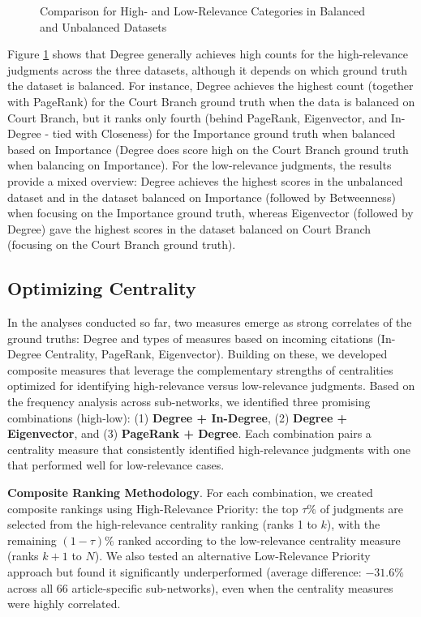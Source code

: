 \documentclass[sigconf,authordraft]{acmart}
\begin{document}
\begin{figure}[t!]
    \caption{Comparison for High- and Low-Relevance Categories in Balanced and Unbalanced Datasets}
    \label{fig:performers}
\end{figure}


Figure \ref{fig:performers} shows that Degree generally achieves high counts for the high-relevance judgments across the three datasets, although it depends on which ground truth the dataset is balanced. For instance, Degree achieves the highest count (together with PageRank) for the Court Branch ground truth when the data is balanced on Court Branch, but it ranks only fourth (behind PageRank, Eigenvector, and In-Degree - tied with Closeness) for the Importance ground truth when balanced based on Importance (Degree does score high on the Court Branch ground truth when balancing on Importance).
For the low-relevance judgments, the results provide a mixed overview: Degree achieves  the highest scores in the unbalanced dataset and in the dataset balanced on Importance (followed by Betweenness) when focusing on the Importance ground truth, whereas Eigenvector (followed by Degree) gave the highest scores in the dataset balanced on Court Branch (focusing on the Court Branch ground truth).


\subsection{Optimizing Centrality}

In the analyses conducted so far, two measures emerge as strong correlates of the ground truths: Degree and types of measures based on incoming citations (In-Degree Centrality, PageRank, Eigenvector). Building on these, we developed composite measures that leverage the complementary strengths of centralities optimized for identifying high-relevance versus low-relevance judgments. Based on the frequency analysis across sub-networks, we identified three promising combinations (high-low): (1) \textbf{Degree + In-Degree}, (2) \textbf{Degree + Eigenvector}, and (3) \textbf{PageRank + Degree}. Each combination pairs a centrality measure that consistently identified high-relevance judgments with one that performed well for low-relevance cases.

\noindent\textbf{Composite Ranking Methodology}.
For each combination, we created composite rankings using High-Relevance Priority: the top $\tau\%$ of judgments are selected from the high-relevance centrality ranking (ranks 1 to $k$), with the remaining $(1-\tau)\%$ ranked according to the low-relevance centrality measure (ranks $k+1$ to $N$). We also tested an alternative Low-Relevance Priority approach but found it significantly underperformed (average difference: $-31.6\%$ across all 66 article-specific sub-networks), even when the centrality measures were highly correlated.
\end{document}
